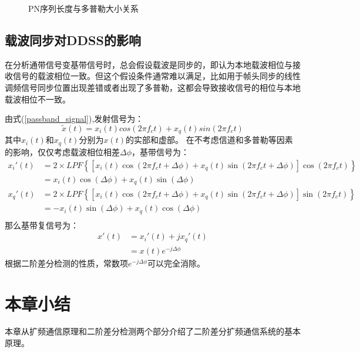 \begin{figure}[htbp]
	\centering
	\begin{minipage}{0.8\textwidth}
		\centering
		\subfigure[多普勒较大时]{
			
		}
	\end{minipage}
	\begin{minipage}{0.8\textwidth}
		\centering
		\subfigure[多普勒较小时]{
			
		}
	\end{minipage}	
	\caption{PN序列长度与多普勒大小关系}
	\label{fig::pnwdopler}
\end{figure}

\subsection{载波同步对DDSS的影响}
在分析通带信号变基带信号时，总会假设载波是同步的，即认为本地载波相位与接收信号的载波相位一致。但这个假设条件通常难以满足，比如用于帧头同步的线性调频信号同步位置出现差错或者出现了多普勒，这都会导致接收信号的相位与本地载波相位不一致。

由式(\ref{passband_signal}),发射信号为：
\[
\widetilde{x}(t)=x_i(t)cos(2\pi f_ct)+x_q(t)sin(2\pi f_ct)
\]
其中$x_i(t)$和$x_q(t)$分别为$x(t)$的实部和虚部。
在不考虑信道和多普勒等因素的影响，仅仅考虑载波相位相差$\Delta\phi$，基带信号为：
%
\begin{equation}
\label{equ:ddcode:sig}
\begin{split}
x_i'(t)&=2\times LPF\left\lbrace \left[ x_i(t)\cos(2\pi f_ct+\Delta\phi) +x_q(t)\sin(2\pi f_ct+\Delta\phi)\right] \cos(2\pi f_ct)\right\rbrace \\
&=x_i(t)\cos(\Delta \phi)+x_q(t)\sin(\Delta \phi) \\
x_q'(t)&=2\times LPF\left\lbrace \left[ x_i(t)\cos(2\pi f_ct+\Delta\phi) +x_q(t)\sin(2\pi f_ct+\Delta\phi)\right] \sin(2\pi f_ct)\right\rbrace \\
&=-x_i(t)\sin(\Delta \phi)+x_q(t)\cos(\Delta \phi) \\
\end{split}
\end{equation}
那么基带复信号为：
\begin{equation}
\begin{split}
x'(t)&=x_i'(t)+jx_q'(t)\\
&=x(t)e^{-j\Delta\phi}
\end{split}
\end{equation}
根据二阶差分检测的性质，常数项$e^{-j\Delta \phi}$可以完全消除。

\section{本章小结}
本章从扩频通信原理和二阶差分检测两个部分介绍了二阶差分扩频通信系统的基本原理。